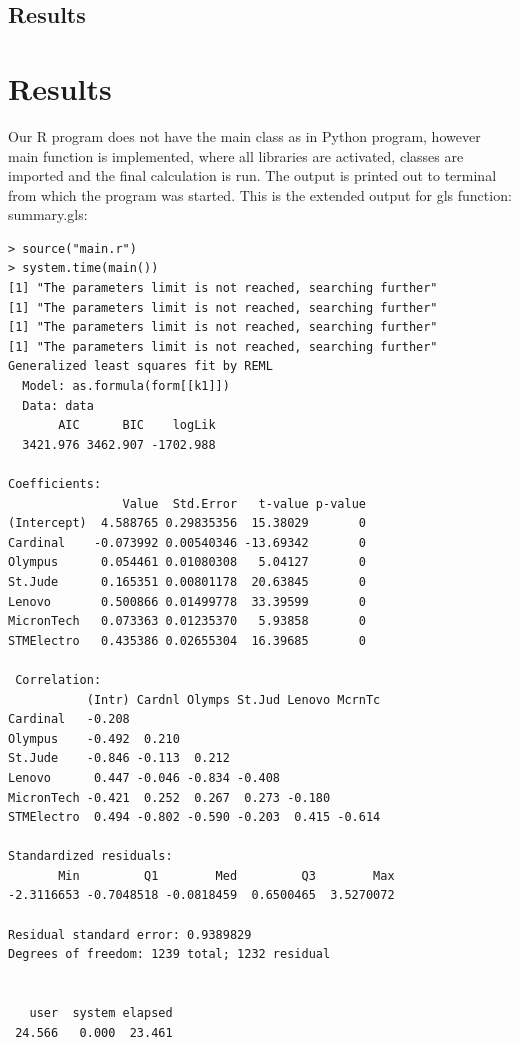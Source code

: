 \documentclass{article}
\begin{document}
\subsection{Results}

\newpage
\section{Results}
Our R program does not have the main class as in Python program, however main function is implemented, where all libraries are activated, classes are imported and the final calculation is run. The output is printed out to terminal from which the program was started. This is the extended output for gls function: summary.gls:
\begin{verbatim}
> source("main.r")
> system.time(main())
[1] "The parameters limit is not reached, searching further"
[1] "The parameters limit is not reached, searching further"
[1] "The parameters limit is not reached, searching further"
[1] "The parameters limit is not reached, searching further"
Generalized least squares fit by REML
  Model: as.formula(form[[k1]]) 
  Data: data 
       AIC      BIC    logLik
  3421.976 3462.907 -1702.988

Coefficients:
                Value  Std.Error   t-value p-value
(Intercept)  4.588765 0.29835356  15.38029       0
Cardinal    -0.073992 0.00540346 -13.69342       0
Olympus      0.054461 0.01080308   5.04127       0
St.Jude      0.165351 0.00801178  20.63845       0
Lenovo       0.500866 0.01499778  33.39599       0
MicronTech   0.073363 0.01235370   5.93858       0
STMElectro   0.435386 0.02655304  16.39685       0

 Correlation: 
           (Intr) Cardnl Olymps St.Jud Lenovo McrnTc
Cardinal   -0.208                                   
Olympus    -0.492  0.210                            
St.Jude    -0.846 -0.113  0.212                     
Lenovo      0.447 -0.046 -0.834 -0.408              
MicronTech -0.421  0.252  0.267  0.273 -0.180       
STMElectro  0.494 -0.802 -0.590 -0.203  0.415 -0.614

Standardized residuals:
       Min         Q1        Med         Q3        Max 
-2.3116653 -0.7048518 -0.0818459  0.6500465  3.5270072 

Residual standard error: 0.9389829 
Degrees of freedom: 1239 total; 1232 residual


   user  system elapsed 
 24.566   0.000  23.461 

\end{verbatim}    
\end{document}
